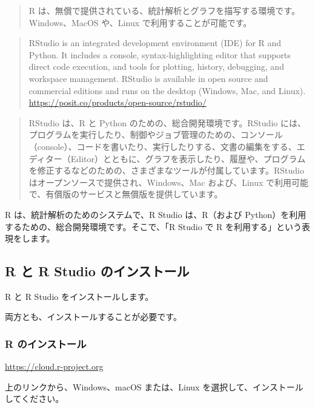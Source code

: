 \documentclass[
]{bxjsbook}
\theoremstyle{definition}
\theoremstyle{definition}
\theoremstyle{definition}
\theoremstyle{definition}
\theoremstyle{remark}
\begin{document}
\begin{quote}
R は、無償で提供されている、統計解析とグラフを描写する環境です。Windows、MacOS や、Linux で利用することが可能です。
\end{quote}

\begin{quote}
RStudio is an integrated development environment (IDE) for R and Python. It includes a console, syntax-highlighting editor that supports direct code execution, and tools for plotting, history, debugging, and workspace management. RStudio is available in open source and commercial editions and runs on the desktop (Windows, Mac, and Linux).　\url{https://posit.co/products/open-source/rstudio/}
\end{quote}

\begin{quote}
RStudio は、R と Python のための、総合開発環境です。RStudio には、プログラムを実行したり、制御やジョブ管理のための、コンソール（console）、コードを書いたり、実行したりする、文書の編集をする、エディター（Editor）とともに、グラフを表示したり、履歴や、プログラムを修正するなどのための、さまざまなツールが付属しています。RStudio はオープンソースで提供され、Windows、Mac および、Linux で利用可能で、有償版のサービスと無償版を提供しています。
\end{quote}

R は、統計解析のためのシステムで、R Studio は、R（および Python）を利用するための、総合開発環境です。そこで、「R Studio で R を利用する」という表現をします。

\hypertarget{r-ux3068-r-studio-ux306eux30a4ux30f3ux30b9ux30c8ux30fcux30eb}{%
\subsection{R と R Studio のインストール}\label{r-ux3068-r-studio-ux306eux30a4ux30f3ux30b9ux30c8ux30fcux30eb}}

R と R Studio をインストールします。

両方とも、インストールすることが必要です。

\hypertarget{r-ux306eux30a4ux30f3ux30b9ux30c8ux30fcux30eb}{%
\subsubsection{R のインストール}\label{r-ux306eux30a4ux30f3ux30b9ux30c8ux30fcux30eb}}

\url{https://cloud.r-project.org}

上のリンクから、Windows、macOS または、Linux を選択して、インストールしてください。
\end{document}
